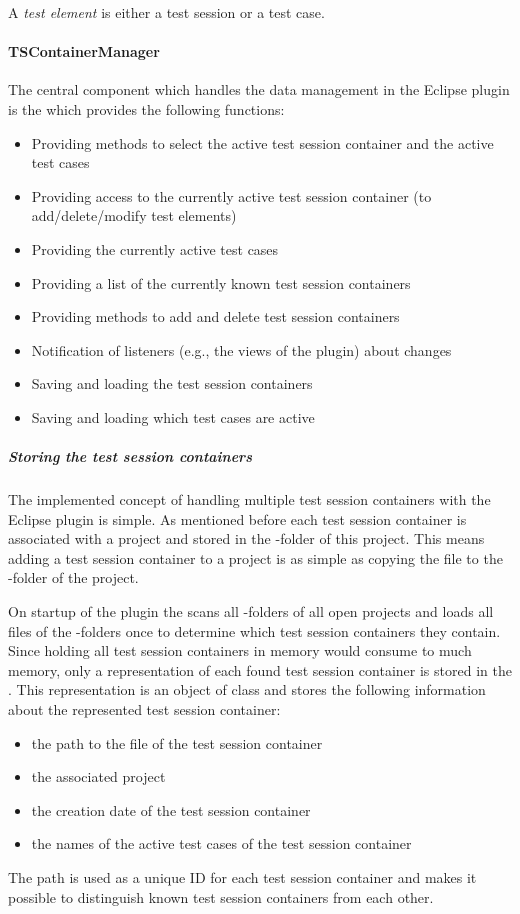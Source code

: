 A \emph{test element} is either a test session or a test case.

\paragraph{TSContainerManager}

The central component which handles the data management in the Eclipse plugin is the  which provides the following functions:
\begin{itemize}
\item Providing methods to select the active test session container and the active test cases
\item Providing access to the currently active test session container (to add/delete/modify test elements)
\item Providing the currently active test cases
\item Providing a list of the currently known test session containers
\item Providing methods to add and delete test session containers
\item Notification of listeners (e.g., the views of the plugin) about changes
\item Saving and loading the test session containers
\item Saving and loading which test cases are active
\end{itemize}

\subparagraph{Storing the test session containers}

The implemented concept of handling multiple test session containers with the Eclipse plugin is simple. As mentioned before each test session container is associated with a project and stored in the \gbt-folder of this project. This means adding a test session container to a project is as simple as copying the file to the \gbt-folder of the project.

On startup of the plugin the  scans all \gbt-folders of all open projects and loads all files of the \gbt-folders once to determine which test session containers they contain. Since holding all test session containers in memory would consume to much memory, only a representation of each found test session container is stored in the . This representation is an object of class  and stores the following information about the represented test session container:
\begin{itemize}
\item the path to the file of the test session container
\item the associated project
\item the creation date of the test session container
\item the names of the active test cases of the test session container
\end{itemize}
The path is used as a unique ID for each test session container and makes it possible to distinguish known test session containers from each other.

